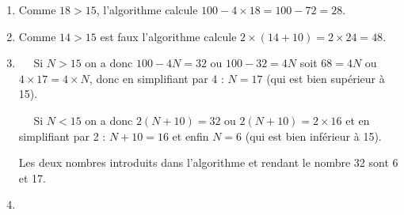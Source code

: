 
\medskip

%

\begin{enumerate}
\item %
Comme $18 > 15$, l'algorithme calcule $100 - 4 \times 18 = 100 - 72 = 28$.
\item %
Comme $14 > 15$ est faux l'algorithme calcule $2 \times (14 + 10) = 2 \times 24 = 48$.
\item %
\starredbullet~~ Si $N > 15$ on a donc $100 - 4N = 32$ ou $100 - 32 = 4N$ soit $68 = 4N$ ou $4 \times 17 = 4 \times N$, donc en simplifiant par 4 : $N = 17$ (qui est bien supérieur à 15).

\starredbullet~~ Si $N <  15$ on a donc $2(N + 10) = 32$ ou $2(N + 10) = 2\times 16$ et en simplifiant par 2 : $N + 10 = 16$ et enfin $N = 6$ (qui est bien inférieur à 15).

Les deux nombres introduits dans l'algorithme et rendant le nombre 32 sont 6 et 17.
\item %



\end{enumerate}
